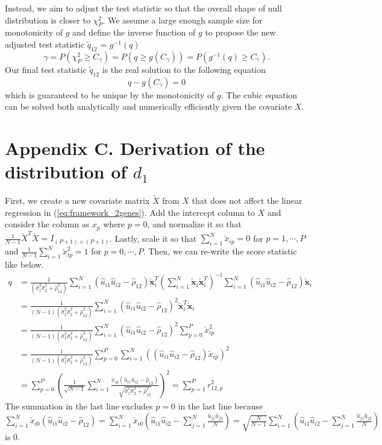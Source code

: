 \documentclass[aoas,authoryear, preprint]{imsart}
\numberwithin{equation}{section}
\theoremstyle{plain}
\begin{document}
\vspace{5mm} 
Instead, we aim to adjust the test statistic so that the overall shape of null distribution is closer to $\chi_{P}^2$. We assume a large enough sample size for monotonicity of $g$ and define the inverse function of $g$ to propose the new adjusted test statistic $\tilde{q}_{12}$ = $g^{-1}(q)$
$$\gamma = P(\chi_{P}^2 \geq C_{\gamma}) = P(q \geq g(C_{\gamma})) = P(g^{-1}(q) \geq C_{\gamma}).$$
Our final test statistic $\tilde{q}_{12}$ is the real solution to the following equation 
$$q - g(C_{\gamma}) = 0$$
which is guaranteed to be unique by the monotonicity of $g$. The cubic equation can be solved both analytically and numerically efficiently given the covariate $X$. 

\section*{Appendix C. Derivation of the distribution of $d_1$}

First, we create a new covariate matrix $\check{X}$ from $X$ that does not affect the linear regression in (\ref{eq:framework_2genes}). Add the intercept column to $X$ and consider the column as $x_p$ where $p = 0$, and normalize it so that $\frac{1}{N-1}\check{X}^T\check{X} = I_{(P+1) \times (P+1)}$. Lastly, scale it so that $\sum_{i=1}^{N} \check{x}_{ip} = 0$ for $p = 1, \cdots, P$ and $\frac{1}{N-1}\sum_{i=1}^{N} \check{x}_{ip}^2 = 1$ for $p = 0, \cdots, P$. Then, we can re-write the score statistic like below.
\begin{align*}
q &= \frac{1}{(\hat{\sigma}_1^2 \hat{\sigma}_2^2 + \hat{\rho}_{12}^2)} \sum_{i=1}^{N} (\hat{u}_{i1}\hat{u}_{i2}-\hat{\rho}_{12})\check{\bm{x}}_i^T \left( \sum_{i=1}^{N} \check{\bm{x}}_i \check{\bm{x}}_i^T \right)^{-1} \sum_{i=1}^{N} (\hat{u}_{i1}\hat{u}_{i2} - \hat{\rho}_{12})\check{\bm{x}}_i\\
&= \frac{1}{(N-1)(\hat{\sigma}_1^2\hat{\sigma}_2^2 + \hat{\rho}_{12}^2)} \sum_{i=1}^{N} (\hat{u}_{i1}\hat{u}_{i2}-\hat{\rho}_{12})^2\bm{\check{x}}_i^T\bm{\check{x}}_i\\
    &= \frac{1}{(N-1)(\hat{\sigma}_1^2\hat{\sigma}_2^2 + \hat{\rho}_{12}^2)} \sum_{i=1}^{N} (\hat{u}_{i1}\hat{u}_{i2} - \hat{\rho}_{12})^2\sum_{p=0}^{P} \check{x}_{ip}^2\\
    &= \frac{1}{(N-1)(\hat{\sigma}_1^2\hat{\sigma}_2^2 + \hat{\rho}_{12}^2)} \sum_{p=0}^{P} \sum_{i=1}^{N} \left( (\hat{u}_{i1} \hat{u}_{i2} - \hat{\rho}_{12} )\check{x}_{ip}\right)^2\\
    &= 
 \sum_{p=0}^{P}\left(\frac{1}{\sqrt{N-1}}
 \sum_{i=1}^{N} \frac{\check{x}_{ip} \left(\hat{u}_{i1}\hat{u}_{i2} - \hat{\rho}_{12} \right)}{\sqrt{\hat{\sigma}_{1}^2\hat{\sigma}_{2}^2 + \hat{\rho}_{12}^2}}
\right)^2 = \sum_{p=1}^{P}r_{12,p}^2
\end{align*}
The summation in the last line excludes $p = 0$ in the last line because $\sum_{i=1}^{N} \check{x}_{i0}(\hat{u}_{i1}\hat{u}_{i2} - \hat{\rho}_{12}) =
\sum_{i=1}^{N} \check{x}_{i0}(\hat{u}_{i1}\hat{u}_{i2} - \sum_{j=1}^{N}\frac{\hat{u}_{j1} \hat{u}_{j2}}{N}) = 
 \sqrt{\frac{N}{N-1}}\sum_{i=1}^{N} (\hat{u}_{i1}\hat{u}_{i2} - \sum_{j=1}^{N}\frac{\hat{u}_{j1} \hat{u}_{j2}}{N})
$ is 0. \\
\end{document}
